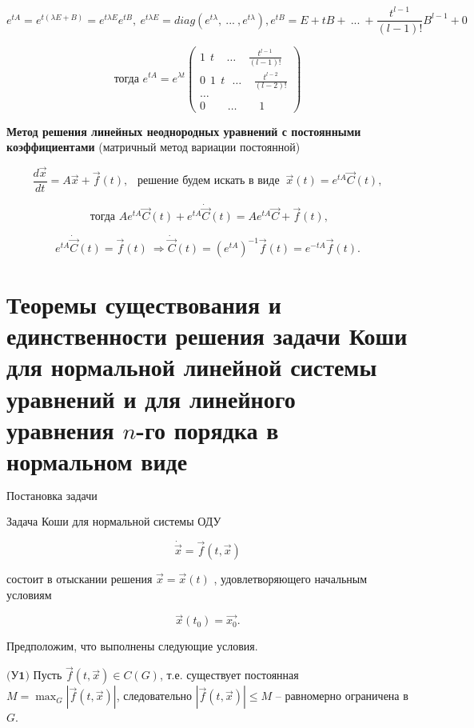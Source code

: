 \[ e^{tA} = e^{t(\lambda E + B)} = e^{t\lambda E}e^{tB},\ e^{t\lambda E} = diag(e^{t\lambda},\ ...\ , e^{t\lambda}), e^{tB} = E + tB +\ ...\ + \frac{t^{l-1}}{(l-1)!}B^{l-1} + 0 \]

\begin{equation*}
	\text{тогда } e^{tA} = e^{\lambda t}
 	\begin{pmatrix}
            1\ \ t\ \ \ \ \  \dots\ \ \ \ \ \frac{t^{l-1}}{(l-1)!} \\
            0\ \ 1\ \ t\ \ \ \dots\ \ \ \ \  \frac{t^{l-2}}{(l-2)!} \\
            \dots \\
            0\ \ \ \ \ \ \ \ \ \dots\ \ \ \ \ \ \ \ \  1
    \end{pmatrix}
\end{equation*}

\textbf{Метод решения линейных неоднородных уравнений с постоянными коэффициентами} (матричный метод вариации постоянной)

\[ \frac{d\vec{x}}{dt} = A\vec{x} + \vec{f}(t),\ \ \text{ решение будем искать в виде } \ \vec{x}(t) = e^{tA}\vec{C}(t), \]

\[ \text{ тогда } Ae^{tA}\vec{C}(t) + e^{tA}\dot{\vec{C}}(t) = Ae^{tA}\vec{C} + \vec{f}(t),\]

\[ e^{tA}\dot{\vec{C}}(t) = \vec{f}(t)\ \Rightarrow \dot{\vec{C}}(t) = (e^{tA})^{-1}\vec{f}(t) = e^{-tA}\vec{f}(t). \]

\newpage

\section{Теоремы существования и единственности решения задачи Коши для нормальной линейной системы уравнений и
для линейного уравнения $n$-го порядка в нормальном виде}

$\textbf{Постановка задачи}$

Задача Коши для нормальной системы ОДУ

\begin{equation}
 \dot{\vec{x}} = \vec{f}(t, \vec{x})
 \label{Issue5_2}
\end{equation}

состоит в отыскании решения $\vec{x} = \vec{x}(t)$ , удовлетворяющего начальным условиям

\[ \vec{x}(t_0) = \vec{x_0} .\]


Предположим, что выполнены следующие условия.

$\textbf{(У1)}$ Пусть $\vec{f}(t, \vec{x}) \in C(G)$, т.е. существует постоянная $M=\max _{G}|\vec{f}(t, \vec{x})|$, следовательно $|\vec{f}(t, \vec{x})| \leq M$ -- равномерно ограничена в $G$.


